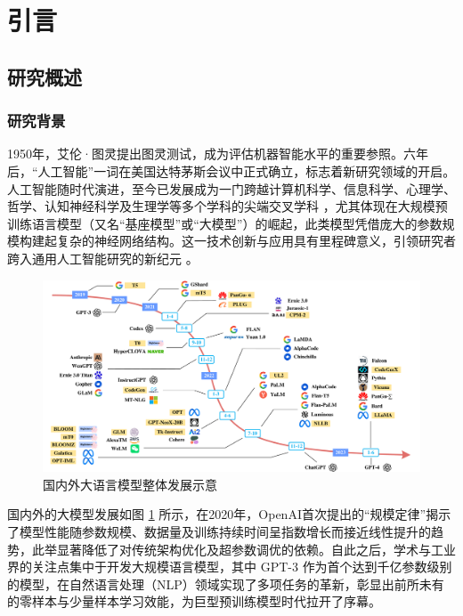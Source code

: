 \section{引言}

\subsection{研究概述}

\subsubsection{研究背景}
1950年，艾伦·图灵提出图灵测试\cite{XSYK202306001}，成为评估机器智能水平的重要参照。六年后，“人工智能”一词在美国达特茅斯会议中正式确立，标志着新研究领域的开启。人工智能随时代演进，至今已发展成为一门跨越计算机科学、信息科学、心理学、哲学、认知神经科学及生理学等多个学科的尖端交叉学科 \cite{YUAN200905001}，尤其体现在大规模预训练语言模型（又名“基座模型”或“大模型”）的崛起，此类模型凭借庞大的参数规模构建起复杂的神经网络结构\cite{bommasani2022opportunities}。这一技术创新与应用具有里程碑意义，引领研究者跨入通用人工智能研究的新纪元 \cite{ZXTX20240416002}。

\begin{figure}[ht]
  \centering
  \includegraphics[width=1.0\textwidth]{./Img/大模型发展绘图.pdf}
  \caption{国内外大语言模型整体发展示意}\label{fig:a-00}
\end{figure}

国内外的大模型发展如图 \ref{fig:a-00} 所示，在2020年，OpenAI首次提出的“规模定律”揭示了模型性能随参数规模、数据量及训练持续时间呈指数增长而接近线性提升的趋势，此举显著降低了对传统架构优化及超参数调优的依赖。自此之后，学术与工业界的关注点集中于开发大规模语言模型，其中 GPT-3 \cite{brown2020language} 作为首个达到千亿参数级别的模型，在自然语言处理（NLP）领域实现了多项任务的革新，彰显出前所未有的零样本与少量样本学习效能，为巨型预训练模型时代拉开了序幕。

